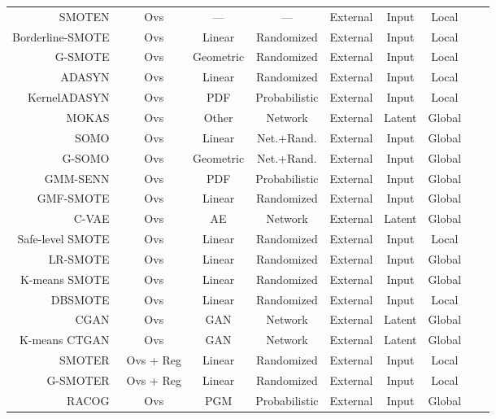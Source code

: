 \begin{longtable}{rcccccccc}
    SMOTEN~\cite{Chawla2002} & Ovs & --- & --- & External & Input & Local \\
    Borderline-SMOTE~\cite{Han2005} & Ovs & Linear & Randomized & External & Input & Local \\
    G-SMOTE~\cite{Douzas2019} & Ovs & Geometric & Randomized & External & Input & Local \\
    ADASYN~\cite{HaiboHe2008} & Ovs & Linear & Randomized & External & Input & Local \\
    KernelADASYN~\cite{tang2015kerneladasyn} & Ovs & PDF & Probabilistic & External & Input & Local \\
    MOKAS~\cite{lin2017minority} & Ovs & Other & Network & External & Latent & Global \\
    SOMO~\cite{Douzas2017} & Ovs & Linear & Net.+Rand. & External & Input & Global \\
    G-SOMO~\cite{douzas2021g} & Ovs & Geometric & Net.+Rand. & External & Input & Global \\
    GMM-SENN~\cite{xing2022predict} & Ovs & PDF & Probabilistic & External & Input & Global \\
    GMF-SMOTE~\cite{xu2022synthetic} & Ovs & Linear & Randomized & External & Input & Global \\
    C-VAE~\cite{dai2019generative} & Ovs & AE & Network & External & Latent & Global \\
    Safe-level SMOTE~\cite{bunkhumpornpat2009safe} & Ovs & Linear & Randomized & External & Input & Local \\
    LR-SMOTE~\cite{liang2020lr} & Ovs & Linear & Randomized & External & Input & Global \\
    K-means SMOTE~\cite{Douzas2018} & Ovs & Linear & Randomized & External & Input & Global\\
    DBSMOTE~\cite{bunkhumpornpat2012dbsmote} & Ovs & Linear & Randomized & External & Input & Local\\
    CGAN~\cite{douzas2018effective} & Ovs & GAN & Network & External & Latent & Global \\
    K-means CTGAN~\cite{an2021k} & Ovs & GAN & Network & External & Latent & Global \\
    SMOTER~\cite{torgo2013smote} & Ovs + Reg & Linear & Randomized & External & Input & Local \\
    G-SMOTER~\cite{camacho2022geometric} & Ovs + Reg & Linear & Randomized & External & Input & Local \\
    RACOG~\cite{das2014racog} & Ovs & PGM & Probabilistic & External & Input & Global \\

\end{longtable}
